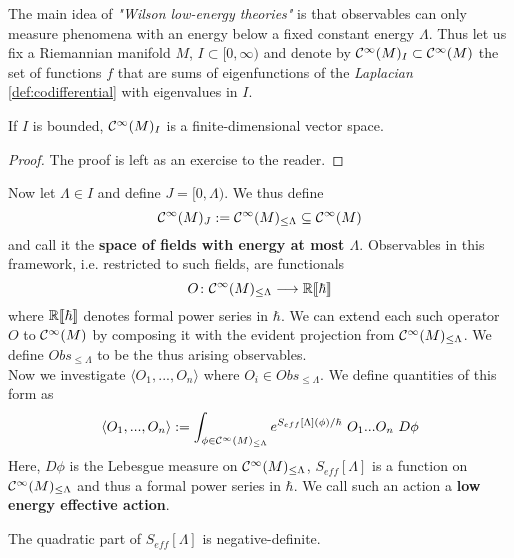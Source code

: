 The main idea of \emph{"Wilson low-energy theories"} is that observables can only measure phenomena with an energy below a fixed constant energy $\Lambda$. Thus let us fix a Riemannian manifold $M$, $I \subset [0,\infty)$ and denote by $\mathcal{C}^{\infty}(M)_I \subset \mathcal{C}^{\infty}(M)$ the set of functions $f$ that are sums of eigenfunctions of the \emph{Laplacian} \ref{def:codifferential} with eigenvalues in $I$.

\begin{lem}
  If $I$ is bounded, $\mathcal{C}^{\infty}(M)_I$ is a finite-dimensional vector space.
\begin{proof}
  The proof is left as an exercise to the reader.
\end{proof}
\end{lem}

Now let $\Lambda \in I$ and define $J = [0,\Lambda)$. We thus define
\begin{equation} \mathcal{C}^{\infty}(M)_J := \mathcal{C}^{\infty}(M)_{\leq \Lambda} \subseteq \mathcal{C}^{\infty}(M)\end{equation}
and call it the \textbf{space of fields with energy at most $\Lambda$}. Observables in this framework, i.e. restricted to such fields, are functionals
\begin{equation} O \colon \mathcal{C}^{\infty}(M)_{\leq \Lambda} \longrightarrow \mathbb{R}\llbracket\hbar\rrbracket\end{equation}
where $\mathbb{R}\llbracket\hbar\rrbracket$ denotes formal power series in $\hbar$. We can extend each such operator $O$ to $\mathcal{C}^{\infty}(M)$ by composing it with the evident projection from $\mathcal{C}^{\infty}(M)_{\leq \Lambda}$. We define $Obs_{\leq \Lambda}$ to be the thus arising observables.\\

Now we investigate $\langle O_1, ..., O_n \rangle$ where $O_i \in Obs_{\leq \Lambda}$. We define quantities of this form as
\begin{equation} \langle O_1, ..., O_n \rangle := \int_{\phi \in \Ci(M)_{\leq \Lambda}} e^{S_{eff}[\Lambda](\phi) / \hbar} \ O_1 ... O_n \ D\phi\end{equation}
Here, $D\phi$ is the Lebesgue measure on $\mathcal{C}^{\infty}(M)_{\leq \Lambda}$, $S_{eff}[\Lambda]$ is a function on $\mathcal{C}^{\infty}(M)_{\leq \Lambda}$ and thus a formal power series in $\hbar$. We call such an action a \textbf{low energy effective action}.

\begin{rem}
  The quadratic part of $S_{eff}[\Lambda]$ is negative-definite.
\end{rem}

